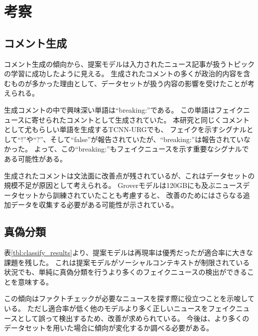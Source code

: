 \section{考察}
\subsection{コメント生成}
コメント生成の傾向から、提案モデルは入力されたニュース記事が扱うトピックの学習に成功したように見える。
生成されたコメントの多くが政治的内容を含むものが多かった理由として、データセットが扱う内容の影響を受けたことが考えられる。

生成コメントの中で興味深い単語は``breaking:''である。
この単語はフェイクニュースに寄せられたコメントとして生成されていた。
本研究と同じくコメントとして尤もらしい単語を生成するTCNN-URG\cite{ijcai2018-533}でも、
フェイクを示すシグナルとして``!''や``?''、そして``false''が報告されていたが、``breaking:''は報告されていなかった。
よって、この``breaking:''もフェイクニュースを示す重要なシグナルである可能性がある。

生成されたコメントは文法面に改善点が残されているが、これはデータセットの規模不足が原因として考えられる。
Groverモデルは120GBにも及ぶニュースデータセットから訓練されていた\cite{NIPS2019_9106}ことも考慮すると、
改善のためにはさらなる追加データを収集する必要がある可能性が示されている。

\subsection{真偽分類}
表\ref{tbl:classify_results}より、提案モデルは再現率は優秀だったが適合率に大きな課題を残した。
これは提案モデルがソーシャルコンテキストが制限されている状況でも、単純に真偽分類を行うより多くのフェイクニュースの検出ができることを意味する。

この傾向はファクトチェックが必要なニュースを探す際に役立つことを示唆している。
ただし適合率が低く他のモデルより多く正しいニュースをフェイクニュースとして誤って検出するため、改善が求められている。
今後は、より多くのデータセットを用いた場合に傾向が変化するか調べる必要がある。
